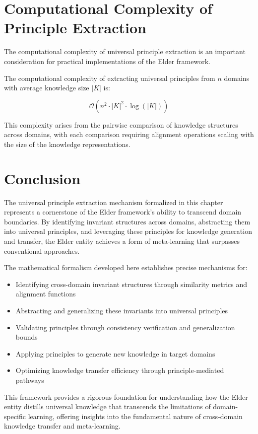 \section{Computational Complexity of Principle Extraction}

The computational complexity of universal principle extraction is an important consideration for practical implementations of the Elder framework.

\begin{theorem}
The computational complexity of extracting universal principles from $n$ domains with average knowledge size $|K|$ is:

\begin{equation}
\mathcal{O}(n^2 \cdot |K|^2 \cdot \log(|K|))
\end{equation}
\end{theorem}

This complexity arises from the pairwise comparison of knowledge structures across domains, with each comparison requiring alignment operations scaling with the size of the knowledge representations.

\section{Conclusion}

The universal principle extraction mechanism formalized in this chapter represents a cornerstone of the Elder framework's ability to transcend domain boundaries. By identifying invariant structures across domains, abstracting them into universal principles, and leveraging these principles for knowledge generation and transfer, the Elder entity achieves a form of meta-learning that surpasses conventional approaches.

The mathematical formalism developed here establishes precise mechanisms for:
\begin{itemize}
    \item Identifying cross-domain invariant structures through similarity metrics and alignment functions
    \item Abstracting and generalizing these invariants into universal principles
    \item Validating principles through consistency verification and generalization bounds
    \item Applying principles to generate new knowledge in target domains
    \item Optimizing knowledge transfer efficiency through principle-mediated pathways
\end{itemize}

This framework provides a rigorous foundation for understanding how the Elder entity distills universal knowledge that transcends the limitations of domain-specific learning, offering insights into the fundamental nature of cross-domain knowledge transfer and meta-learning.